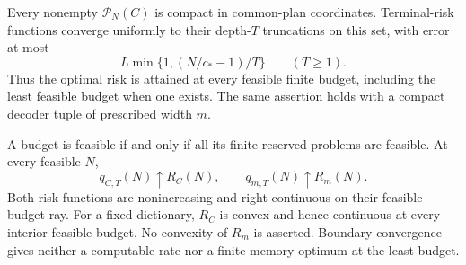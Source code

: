 \begin{theorem}\label{thm:boundary-attainment}
Every nonempty $\mathcal P_N(C)$ is compact in common-plan coordinates. Terminal-risk functions converge uniformly to their depth-$T$ truncations on this set, with error at most
\[
 L\min\{1,(N/c_*-1)/T\}\qquad(T\ge1).
\]
Thus the optimal risk is attained at every feasible finite budget, including the least feasible budget when one exists. The same assertion holds with a compact decoder tuple of prescribed width $m$.

A budget is feasible if and only if all its finite reserved problems are feasible. At every feasible $N$,
\begin{equation}\label{eq:boundary-convergence}
 q_{C,T}(N)\uparrow R_C(N),\qquad q_{m,T}(N)\uparrow R_m(N).
\end{equation}
Both risk functions are nonincreasing and right-continuous on their feasible budget ray. For a fixed dictionary, $R_C$ is convex and hence continuous at every interior feasible budget. No convexity of $R_m$ is asserted. Boundary convergence gives neither a computable rate nor a finite-memory optimum at the least budget.
\end{theorem}
